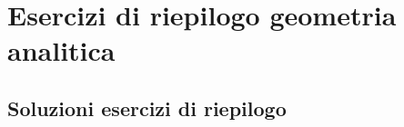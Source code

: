 %	
\chapter{Esercizi di riepilogo geometria analitica}
\tcbstartrecording




\tcbstoprecording
\newpage
\section{Soluzioni esercizi di riepilogo}
\tcbinputrecords							